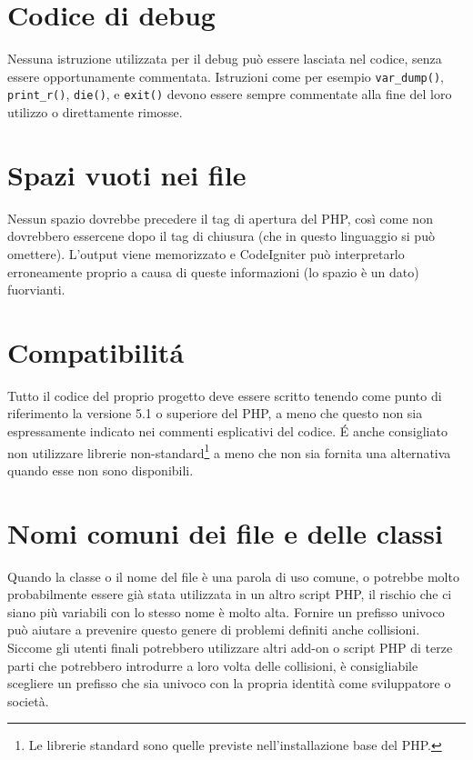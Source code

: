 \section{Codice di debug}
Nessuna istruzione utilizzata per il debug può essere lasciata nel codice, senza essere opportunamente commentata. Istruzioni come per esempio \verb|var_dump()|, \verb|print_r()|, \verb|die()|, e \verb|exit()| devono essere sempre commentate alla fine del loro utilizzo o direttamente rimosse.


\section*{Spazi vuoti nei file}
Nessun spazio dovrebbe precedere il tag di apertura del PHP, così come non dovrebbero essercene dopo il tag di chiusura (che in questo linguaggio si può omettere). L'output viene memorizzato e CodeIgniter può interpretarlo erroneamente proprio a causa di queste informazioni (lo spazio è un dato) fuorvianti.

\section*{Compatibilit\'a}
Tutto il codice del proprio progetto deve essere scritto tenendo come punto di riferimento la versione 5.1 o superiore del PHP, a meno che questo non sia espressamente indicato nei commenti esplicativi del codice. \'E anche consigliato non utilizzare librerie non-standard\footnote{Le librerie standard sono quelle previste nell'installazione base del PHP.} a meno che non sia fornita una alternativa quando esse non sono disponibili.

\section*{Nomi comuni dei file e delle classi}
Quando la classe o il nome del file è una parola di uso comune, o potrebbe molto probabilmente essere già stata utilizzata in un altro script PHP, il rischio che ci siano più variabili con lo stesso nome è molto alta. Fornire un prefisso univoco può  aiutare a prevenire questo genere di problemi definiti anche collisioni. Siccome gli utenti finali potrebbero utilizzare altri add-on o script PHP di terze parti che potrebbero introdurre a loro volta delle collisioni, è consigliabile scegliere un prefisso che sia univoco con la propria identità come sviluppatore o società.

